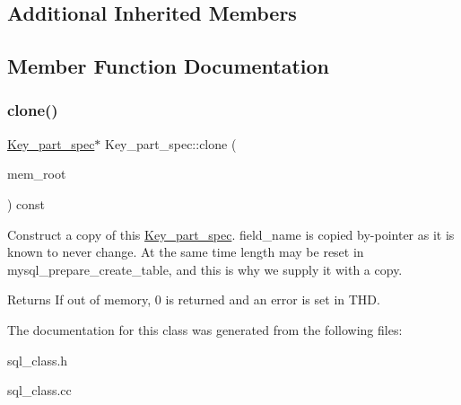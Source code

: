 \subsection*{Additional Inherited Members}


\subsection{Member Function Documentation}
\mbox{\label{classKey__part__spec_adf40542629144b3dc70f9ae4b4b27c78}} 
\subsubsection{\texorpdfstring{clone()}{clone()}}
{\footnotesize\ttfamily \mbox{\hyperlink{classKey__part__spec}{Key\+\_\+part\+\_\+spec}}$\ast$ Key\+\_\+part\+\_\+spec\+::clone (\begin{DoxyParamCaption}\item[{M\+E\+M\+\_\+\+R\+O\+OT $\ast$}]{mem\+\_\+root }\end{DoxyParamCaption}) const\hspace{0.3cm}{\ttfamily [inline]}}

Construct a copy of this \mbox{\hyperlink{classKey__part__spec}{Key\+\_\+part\+\_\+spec}}. field\+\_\+name is copied by-\/pointer as it is known to never change. At the same time \textquotesingle{}length\textquotesingle{} may be reset in mysql\+\_\+prepare\+\_\+create\+\_\+table, and this is why we supply it with a copy.

\begin{DoxyReturn}{Returns}
If out of memory, 0 is returned and an error is set in T\+HD. 
\end{DoxyReturn}


The documentation for this class was generated from the following files\+:\begin{DoxyCompactItemize}
\item 
sql\+\_\+class.\+h\item 
sql\+\_\+class.\+cc\end{DoxyCompactItemize}
